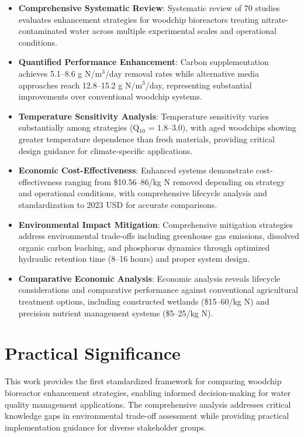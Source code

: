 \documentclass[12pt,a4paper]{article}
\begin{document}
\begin{itemize}[leftmargin=*, itemsep=0.8em]

\item \textbf{Comprehensive Systematic Review}: Systematic review of 70 studies evaluates enhancement strategies for woodchip bioreactors treating nitrate-contaminated water across multiple experimental scales and operational conditions.

\item \textbf{Quantified Performance Enhancement}: Carbon supplementation achieves 5.1--8.6 g N/m$^3$/day removal rates while alternative media approaches reach 12.8--15.2 g N/m$^3$/day, representing substantial improvements over conventional woodchip systems.

\item \textbf{Temperature Sensitivity Analysis}: Temperature sensitivity varies substantially among strategies (Q$_{10}$ = 1.8--3.0), with aged woodchips showing greater temperature dependence than fresh materials, providing critical design guidance for climate-specific applications.

\item \textbf{Economic Cost-Effectiveness}: Enhanced systems demonstrate cost-effectiveness ranging from \$10.56--86/kg N removed depending on strategy and operational conditions, with comprehensive lifecycle analysis and standardization to 2023 USD for accurate comparisons.

\item \textbf{Environmental Impact Mitigation}: Comprehensive mitigation strategies address environmental trade-offs including greenhouse gas emissions, dissolved organic carbon leaching, and phosphorus dynamics through optimized hydraulic retention time (8--16 hours) and proper system design.

\item \textbf{Comparative Economic Analysis}: Economic analysis reveals lifecycle considerations and comparative performance against conventional agricultural treatment options, including constructed wetlands (\$15--60/kg N) and precision nutrient management systems (\$5--25/kg N).

\end{itemize}

\vspace{1cm}

\section*{Practical Significance}

This work provides the first standardized framework for comparing woodchip bioreactor enhancement strategies, enabling informed decision-making for water quality management applications. The comprehensive analysis addresses critical knowledge gaps in environmental trade-off assessment while providing practical implementation guidance for diverse stakeholder groups.
\end{document}
